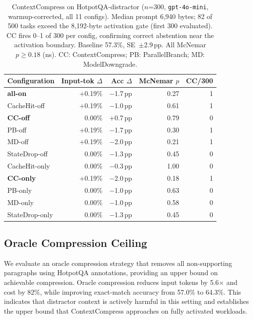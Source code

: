 \begin{table}[t]
\caption{ContextCompress on HotpotQA-distractor ($n$=300, \texttt{gpt-4o-mini},
warmup-corrected, all 11 configs). Median prompt 6,940 bytes; 82 of 500 tasks exceed
the 8,192-byte activation gate (first 300 evaluated). CC fires 0--1 of 300 per
config, confirming correct abstention near the activation boundary. Baseline 57.3\%,
SE~$\pm$2.9\,pp. All McNemar $p \geq 0.18$ (ns).
CC: ContextCompress; PB: ParallelBranch; MD: ModelDowngrade.}
\label{tab:hotpot-matrix}
\small
\begin{tabularx}{\columnwidth}{@{} X r r r r @{}}
\toprule
Configuration & \makecell[r]{Input-tok\\$\Delta$} & Acc $\Delta$ & McNemar $p$ & CC/300 \\
\midrule
\textbf{all-on}              & $+$0.19\% & $-$1.7\,pp & 0.27 & 1 \\
CacheHit-off                 & $+$0.19\% & $-$1.0\,pp & 0.61 & 1 \\
\textbf{CC-off} & $\phantom{+}$0.00\% & $+$0.7\,pp & 0.79 & 0 \\
PB-off           & $+$0.19\% & $-$1.7\,pp & 0.30 & 1 \\
MD-off           & $+$0.19\% & $-$2.0\,pp & 0.21 & 1 \\
StateDrop-off                & $\phantom{+}$0.00\% & $-$1.3\,pp & 0.45 & 0 \\
\midrule
CacheHit-only                & $\phantom{+}$0.00\% & $-$0.3\,pp & 1.00 & 0 \\
\textbf{CC-only}& $+$0.19\% & $-$2.0\,pp & 0.18 & 1 \\
PB-only          & $\phantom{+}$0.00\% & $-$1.0\,pp & 0.63 & 0 \\
MD-only          & $\phantom{+}$0.00\% & $-$1.0\,pp & 0.58 & 0 \\
StateDrop-only               & $\phantom{+}$0.00\% & $-$1.3\,pp & 0.45 & 0 \\
\bottomrule
\end{tabularx}
\end{table}

\subsection{Oracle Compression Ceiling}
\label{sec:eval-oracle}

We evaluate an oracle compression strategy that removes all non-supporting paragraphs
using HotpotQA annotations, providing an upper bound on achievable compression. Oracle
compression reduces input tokens by 5.6$\times$ and cost by 82\%, while improving
exact-match accuracy from 57.0\% to 64.3\%. This indicates that distractor context is
actively harmful in this setting and establishes the upper bound that ContextCompress
approaches on fully activated workloads.

